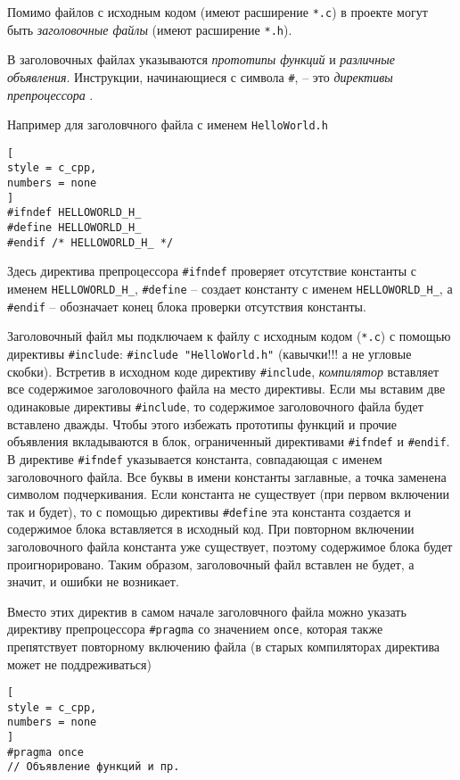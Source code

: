 \documentclass[%
	11pt,
	a4paper,
	utf8,
		]{article}
\begin{document}
Помимо файлов с исходным кодом (имеют расширение \verb|*.c|) в проекте могут быть \emph{заголовочные файлы} (имеют расширение \verb|*.h|).

В заголовочных файлах указываются \emph{прототипы функций} и \emph{различные объявления}. Инструкции, начинающиеся с символа \verb|#|, -- это \emph{директивы препроцессора} \cite[]{prokhorenok-prog-c:2020}.

Например для заголовчного файла с именем \verb|HelloWorld.h|
\begin{lstlisting}[
style = c_cpp,
numbers = none
]
#ifndef HELLOWORLD_H_
#define HELLOWORLD_H_
#endif /* HELLOWORLD_H_ */
\end{lstlisting}

Здесь директива препроцессора \verb|#ifndef| проверяет отсутствие константы с именем \verb|HELLOWORLD_H_|, \verb|#define| -- создает константу с именем \verb|HELLOWORLD_H_|, а \verb|#endif| -- обозначает конец блока проверки отсутствия константы.

Заголовочный файл мы подключаем к файлу с исходным кодом (\verb|*.c|) с помощью директивы \verb|#include|: \verb|#include "HelloWorld.h"| (кавычки!!! а не угловые скобки). Встретив в исходном коде директиву \verb|#include|, \emph{компилятор} вставляет все содержимое заголовочного файла на место директивы. Если мы вставим две одинаковые директивы \verb|#include|, то содержимое заголовочного файла будет вставлено дважды. Чтобы этого избежать прототипы функций и прочие объявления вкладываются в блок, ограниченный директивами \verb|#ifndef| и \verb|#endif|. В директиве \verb|#ifndef| указывается константа, совпадающая с именем заголовочного файла. Все буквы в имени константы заглавные, а точка заменена символом подчеркивания. Если константа не существует (при первом включении так и будет), то с помощью директивы \verb|#define| эта константа создается и содержимое блока вставляется в исходный код. При повторном включении заголовочного файла константа уже существует, поэтому содержимое блока будет проигнорировано. Таким образом, заголовочный файл вставлен не будет, а значит, и ошибки не возникает.

Вместо этих директив в самом начале заголовчного файла можно указать директиву препроцессора \verb|#pragma| со значением \verb|once|, которая также препятствует повторному включению файла (в старых компиляторах директива может не поддреживаться)
\begin{lstlisting}[
style = c_cpp,
numbers = none
]
#pragma once
// Объявление функций и пр.
\end{lstlisting}
\end{document}
